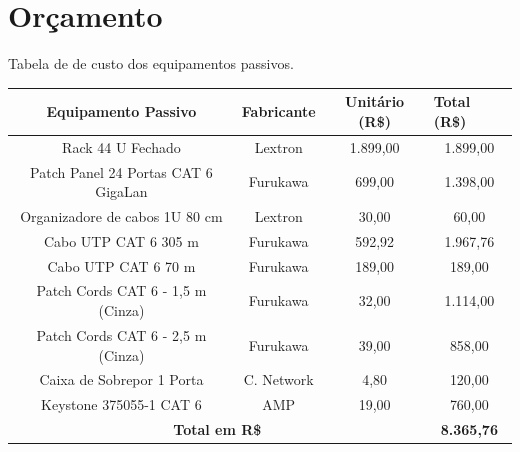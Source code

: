 \documentclass[	DIV=calc,%
							paper=a4,%
							fontsize=12pt,%
							onecolumn]{scrartcl}	 					%
\begin{document}
\section{Orçamento}
Tabela de de custo dos equipamentos passivos.
\vspace{0.5cm}


	\renewcommand{\arraystretch}{1.5}
\begin{tabular}{|c|c|c|c|}
	\hline
	\textbf{Equipamento Passivo}                 & \textbf{Fabricante} & \textbf{ Unitário (R\$)} & \multicolumn{1}{l|}{\textbf{Total (R\$)}} \\ \hline
	Rack 44 U Fechado                            & Lextron             & 1.899,00                         & 1.899,00                                           \\ \hline
	Patch Panel 24 Portas CAT 6 GigaLan  & Furukawa            & 699,00                           & 1.398,00                                           \\ \hline
	Organizadore de cabos 1U 80 cm               & Lextron             & 30,00                            & 60,00                                              \\ \hline
	Cabo UTP CAT 6  305 m           & Furukawa            & 592,92                           & 1.967,76                                           \\ \hline
	Cabo UTP CAT 6  70 m            & Furukawa            & 189,00                           & 189,00                                             \\ \hline
	Patch Cords CAT 6 - 1,5 m (Cinza)            & Furukawa            & 32,00                            & 1.114,00                                           \\ \hline
	Patch Cords CAT 6 - 2,5 m (Cinza)            & Furukawa            & 39,00                            & 858,00                                             \\ \hline
	Caixa de Sobrepor 1 Porta                          & C. Network                & 4,80                             & 120,00                                             \\ \hline
	Keystone 375055-1
	CAT 6                             & AMP                 & 19,00                            & 760,00                                             \\ \hline
	\multicolumn{3}{|c|}{\textbf{Total em R\$}}                                                           & \textbf{8.365,76}                                  \\ \hline
\end{tabular}
\end{document}
